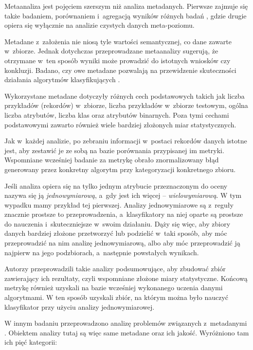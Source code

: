 	Metaanaliza jest pojęciem szerszym niż analiza metadanych.
	Pierwsze zajmuje się także badaniem, porównaniem i~agregacją wyników różnych badań \cite{rosenthal2002meta}, gdzie drugie opiera się wyłącznie na analizie czystych danych meta-poziomu.

	Metadane z~założenia nie niosą tyle wartości semantycznej, co dane zawarte w~zbiorze.
	Jednak dotychczas przeprowadzane metaanalizy sugerują, że otrzymane w~ten sposób wyniki może prowadzić do istotnych wniosków czy konkluzji.
	Badano, czy owe metadane pozwalają na przewidzenie skuteczności działania algorytmów klasyfikujących \cite{brazdil1994characterizing}.

	Wykorzystane metadane dotyczyły różnych cech podstawowych takich jak liczba przykładów (rekordów) w~zbiorze, liczba przykładów w~zbiorze testowym, ogólna liczba atrybutów, liczba klas oraz atrybutów binarnych. Poza tymi cechami podstawowymi zawarto również wiele bardziej złożonych miar statystycznych.

	Jak w~każdej analizie, po zebraniu informacji w~postaci rekordów danych istotne jest, aby zestawić je ze sobą na bazie porównania przypisanej im metryki.
	Wspomniane wcześniej badanie \cite{brazdil1994characterizing} za metrykę obrało znormalizowany błąd generowany przez konkretny algorytm przy kategoryzacji konkretnego zbioru.

	Jeśli analiza opiera się na tylko jednym atrybucie przeznaczonym do oceny nazywa się ją \emph{jednowymiarową}, a~gdy jest ich więcej -- \emph{wielowymiarową}.
	W tym wypadku mamy przykład tej pierwszej.
	Analizy jednowymiarowe są z~reguły znacznie prostsze to przeprowadzenia, a~klasyfikatory na niej oparte są prostsze do nauczenia i~skuteczniejsze w~swoim działaniu.
	Dąży się więc, aby zbiory danych bardziej złożone przetworzyć lub podzielić w~taki sposób, aby móc przeprowadzić na nim analizę jednowymiarową, albo aby móc przeprowadzić ją najpierw na jego podzbiorach, a~następnie powstałych wynikach.

	Autorzy przeprowadzili takie analizy podsumowujące, aby zbudować zbiór zawierający ich rezultaty, czyli wspomniane złożone miary statystyczne.
	Końcową metrykę również uzyskali na bazie wcześniej wykonanego uczenia danymi algorytmami.
	W ten sposób uzyskali zbiór, na którym można było nauczyć klasyfikator przy użyciu analizy jednowymiarowej.

	W innym badaniu przeprowadzono analizę problemów związanych z~metadanymi \cite{yasser2011analysis}.
	Obiektem analizy tutaj są więc same metadane oraz ich jakość.
	Wyróżniono tam ich pięć kategorii:

